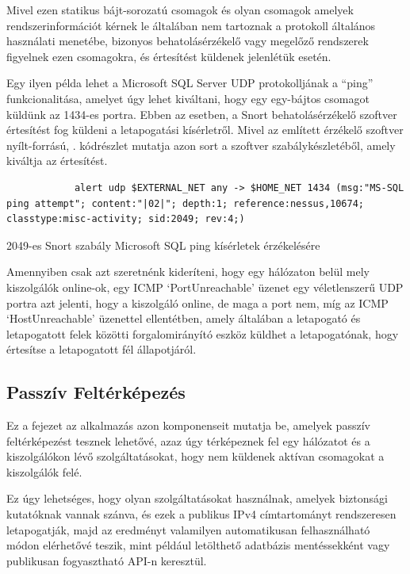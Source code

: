 	Mivel ezen statikus bájt-sorozatú csomagok és olyan csomagok amelyek rendszerinformációt kérnek le általában nem tartoznak a protokoll általános használati menetébe, bizonyos behatolásérzékelő vagy megelőző rendszerek figyelnek ezen csomagokra, és értesítést küldenek jelenlétük esetén.
	
	Egy ilyen példa lehet a Microsoft SQL Server UDP protokolljának a ``ping'' funkcionalitása, amelyet úgy lehet kiváltani, hogy egy egy-bájtos \texttt{} csomagot küldünk az 1434-es portra. Ebben az esetben, a Snort\cite{snort49} behatolásérzékelő szoftver értesítést fog küldeni a letapogatási kísérletről. Mivel az említett érzékelő szoftver nyílt-forrású, \az{\ref{snortrule}}. kódrészlet mutatja azon sort a szoftver szabálykészletéből, amely kiváltja az értesítést.
	
	\begin{listing}[H]
		\begin{verbatim}
			alert udp $EXTERNAL_NET any -> $HOME_NET 1434 (msg:"MS-SQL ping attempt"; content:"|02|"; depth:1; reference:nessus,10674; classtype:misc-activity; sid:2049; rev:4;)
		\end{verbatim}
		\caption{2049-es Snort szabály Microsoft SQL ping kísérletek érzékelésére\cite{snort49}}
		\label{snortrule}
	\end{listing}
	
	Amennyiben csak azt szeretnénk kideríteni, hogy egy hálózaton belül mely kiszolgálók online-ok, egy ICMP `PortUnreachable' üzenet egy véletlenszerű UDP portra azt jelenti, hogy a kiszolgáló online, de maga a port nem, míg az ICMP `HostUnreachable' üzenettel ellentétben, amely általában a letapogató és letapogatott felek közötti forgalomirányító eszköz küldhet a letapogatónak, hogy értesítse a letapogatott fél állapotjáról.

\subsection*{Passzív Feltérképezés}

	Ez a fejezet az alkalmazás azon komponenseit mutatja be, amelyek passzív feltérképezést tesznek lehetővé, azaz úgy térképeznek fel egy hálózatot és a kiszolgálókon lévő szolgáltatásokat, hogy nem küldenek aktívan csomagokat a kiszolgálók felé.
	
	Ez úgy lehetséges, hogy olyan szolgáltatásokat használnak, amelyek biztonsági kutatóknak vannak szánva, és ezek a publikus IPv4 címtartományt rendszeresen letapogatják, majd az eredményt valamilyen automatikusan felhasználható módon elérhetővé teszik, mint például letölthető adatbázis mentéssekként vagy publikusan fogyasztható API-n keresztül.


